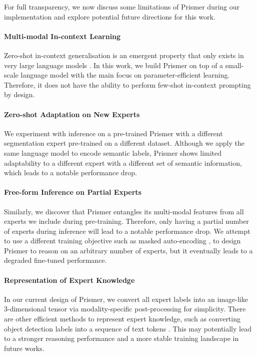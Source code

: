 \documentclass[11pt]{article}
\begin{document}
{For full transparency, we now discuss some limitations of Prismer during our implementation and explore potential future directions for this work.

\paragraph{Multi-modal In-context Learning} Zero-shot in-context generalisation is an emergent property that only exists in very large language models \cite{brown2020gpt3,wei2022emergent}. In this work, we build Prismer on top of a small-scale language model with the main focus on parameter-efficient learning. Therefore, it does not have the ability to perform few-shot in-context prompting by design.

\paragraph{Zero-shot Adaptation on New Experts} We experiment with inference on a pre-trained Prismer with a different segmentation expert pre-trained on a different dataset. Although we apply the same language model to encode semantic labels, Prismer shows limited adaptability to a different expert with a different set of semantic information, which leads to a notable performance drop.

\paragraph{Free-form Inference on Partial Experts} Similarly, we discover that Prismer entangles its multi-modal features from all experts we include during pre-training. Therefore, only having a partial number of experts during inference will lead to a notable performance drop. We attempt to use a different training objective such as masked auto-encoding \cite{bachmann2022multimae}, to design Prismer to reason on an arbitrary number of experts, but it eventually leads to a degraded fine-tuned performance.

\paragraph{Representation of Expert Knowledge} In our current design of Prismer, we convert all expert labels into an image-like 3-dimensional tensor via modality-specific post-processing for simplicity. There are other efficient methods to represent expert knowledge, such as converting object detection labels into a sequence of text tokens \cite{chen2021pix2seq,chen2022pix2seqv2}. This may potentially lead to a stronger reasoning performance and a more stable training landscape in future works.

}
\end{document}
